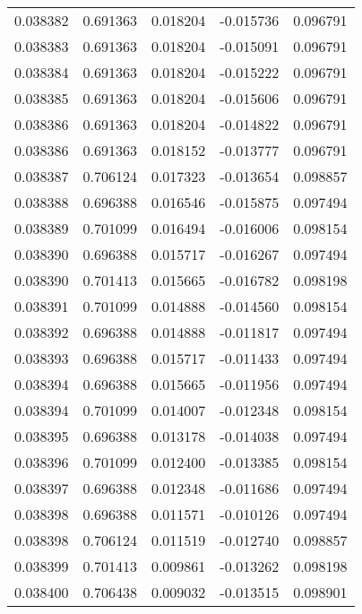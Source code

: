 \begin{tabular}{lrrrr}
0.038382    &  0.691363 &  0.018204 & -0.015736 &             0.096791 \\
0.038383    &  0.691363 &  0.018204 & -0.015091 &             0.096791 \\
0.038384    &  0.691363 &  0.018204 & -0.015222 &             0.096791 \\
0.038385    &  0.691363 &  0.018204 & -0.015606 &             0.096791 \\
0.038386    &  0.691363 &  0.018204 & -0.014822 &             0.096791 \\
0.038386    &  0.691363 &  0.018152 & -0.013777 &             0.096791 \\
0.038387    &  0.706124 &  0.017323 & -0.013654 &             0.098857 \\
0.038388    &  0.696388 &  0.016546 & -0.015875 &             0.097494 \\
0.038389    &  0.701099 &  0.016494 & -0.016006 &             0.098154 \\
0.038390    &  0.696388 &  0.015717 & -0.016267 &             0.097494 \\
0.038390    &  0.701413 &  0.015665 & -0.016782 &             0.098198 \\
0.038391    &  0.701099 &  0.014888 & -0.014560 &             0.098154 \\
0.038392    &  0.696388 &  0.014888 & -0.011817 &             0.097494 \\
0.038393    &  0.696388 &  0.015717 & -0.011433 &             0.097494 \\
0.038394    &  0.696388 &  0.015665 & -0.011956 &             0.097494 \\
0.038394    &  0.701099 &  0.014007 & -0.012348 &             0.098154 \\
0.038395    &  0.696388 &  0.013178 & -0.014038 &             0.097494 \\
0.038396    &  0.701099 &  0.012400 & -0.013385 &             0.098154 \\
0.038397    &  0.696388 &  0.012348 & -0.011686 &             0.097494 \\
0.038398    &  0.696388 &  0.011571 & -0.010126 &             0.097494 \\
0.038398    &  0.706124 &  0.011519 & -0.012740 &             0.098857 \\
0.038399    &  0.701413 &  0.009861 & -0.013262 &             0.098198 \\
0.038400    &  0.706438 &  0.009032 & -0.013515 &             0.098901 \\

\end{tabular}
